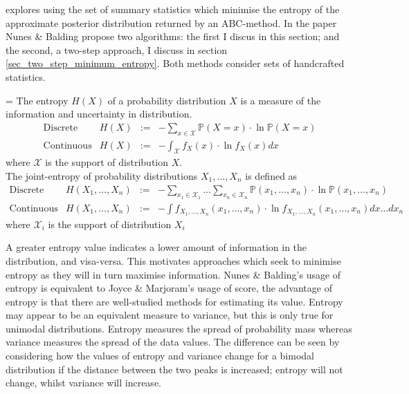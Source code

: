 \documentclass[bibliography=totoc,11pt,a4paper,margin=0]{article}
\newcommand*{\prob}{\mathbb{P}}
\theoremstyle{break}
\begin{document}
  \par \cite[]{on_optimal_selection_of_summary_stats_for_ABC} explores using the set of summary statistics which minimise the entropy of the approximate posterior distribution returned by an ABC-method. In the paper Nunes \& Balding propose two algorithms: the first I discus in this section; and the second, a two-step approach, I discuss in section \ref{sec_two_step_minimum_entropy}. Both methods consider sets of handcrafted statistics.

  \begin{box_definition}
    \everymath={\displaystyle}
    The entropy $H(X)$ of a probability distribution $X$ is a measure of the information and uncertainty in distribution.
    \[\begin{array}{rrcl}
      \text{Discrete}&H(X)&:=&-\sum_{x\in\mathcal{X}}\prob(X=x)\cdot\ln\prob(X=x)\\
      \text{Continuous}&H(X)&:=&-\int_{\mathcal{X}}f_X(x)\cdot\ln f_X(x)dx
    \end{array}\]
    where $\mathcal{X}$ is the support of distribution $X$.\\
    The joint-entropy of probability distributions $X_1,\dots,X_n$ is defined as
    \[\begin{array}{rrcl}
      \text{Discrete}&H(X_1,\dots,X_n)&:=&-\sum_{x_1\in\mathcal{X}_1}\dots\sum_{x_n\in\mathcal{X}_n}\prob(x_1,\dots,x_n)\cdot\ln\prob(x_1,\dots,x_n)\\
      \text{Continuous}&H(X_1,\dots,X_n)&:=&-\int f_{X_1,\dots,X_n}(x_1,\dots,x_n)\cdot\ln f_{X_1,\dots,X_n}(x_1,\dots,x_n)dx\dots dx_n
    \end{array}\]
    where $\mathcal{X}_i$ is the support of distribution $X_i$
  \end{box_definition}

  \par A greater entropy value indicates a lower amount of information in the distribution, and visa-versa. This motivates approaches which seek to minimise entropy as they will in turn maximise information. Nunes \& Balding's usage of entropy is equivalent to Joyce \& Marjoram's usage of score, the advantage of entropy is that there are well-studied methods for estimating its value. Entropy may appear to be an equivalent measure to variance, but this is only true for unimodal distributions. Entropy measures the spread of probability mass whereas variance measures the spread of the data values. The difference can be seen by considering how the values of entropy and variance change for a bimodal distribution if the distance between the two peaks is increased; entropy will not change, whilst variance will increase.
\end{document}
